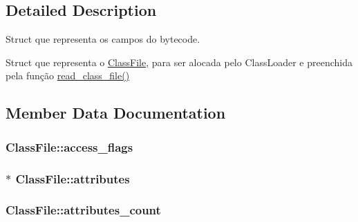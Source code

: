 \subsection{Detailed Description}
Struct que representa os campos do bytecode. 

Struct que representa o \hyperlink{structClassFile}{Class\+File}, para ser alocada pelo Class\+Loader e preenchida pela função \hyperlink{classfile_8c_a14c4d3f84dd03a43aca0a57bd530f3a2}{read\+\_\+class\+\_\+file()} 

\subsection{Member Data Documentation}
\subsubsection[{\texorpdfstring{access\+\_\+flags}{access_flags}}]{ Class\+File\+::access\+\_\+flags}\hypertarget{structClassFile_ae88db578147f7ee0d6fc1aeacb341854}{}\label{structClassFile_ae88db578147f7ee0d6fc1aeacb341854}
\subsubsection[{\texorpdfstring{attributes}{attributes}}]{$\ast$ Class\+File\+::attributes}\hypertarget{structClassFile_a8bf809db8e1008f401dc3cda5e9cdb14}{}\label{structClassFile_a8bf809db8e1008f401dc3cda5e9cdb14}
\subsubsection[{\texorpdfstring{attributes\+\_\+count}{attributes_count}}]{ Class\+File\+::attributes\+\_\+count}\hypertarget{structClassFile_a633c696fbe08e7e7906b2ab1e52f3d1b}{}\label{structClassFile_a633c696fbe08e7e7906b2ab1e52f3d1b}
